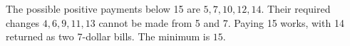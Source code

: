 The possible positive payments below 15 are $5,7,10,12,14$. Their required changes $4,6,9,11,13$ cannot be made from 5 and 7. Paying 15 works, with 14 returned as two 7-dollar bills. The minimum is $\boxed{15}$.
